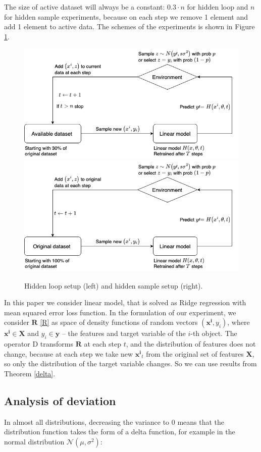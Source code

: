 \documentclass{article}
\begin{document}
        The size of active dataset will always be a constant: $0.3 \cdot n$ for hidden loop and $n$ for hidden sample experiments, because on each step we remove 1 element and add 1 element to active data. The schemes of the experiments is shown in Figure \ref{ex_set}.

        \begin{figure}[h!]
            \centering
            \includegraphics[width=0.49\linewidth]{pictures/Hidden_loop.png}
            \includegraphics[width=0.49\linewidth]{pictures/Hidden_sample.png}
            
            \caption{Hidden loop setup (left) and hidden sample setup (right).}
            \label{ex_set}
        \end{figure}

        In this paper we consider linear model, that is solved as Ridge regression with mean squared error loss function. In the formulation of our experiment, we consider $\mathbf{R}$ \eqref{R} as space of density functions of random vectors $(\mathbf{x^i}, y_i)$, where $\mathbf{x^i} \in \textbf{X}$ and $y_i \in \textbf{y}$ -- the features and target variable of the $i$-th object. The operator $\text{D}$ transforms $\mathbf{R}$ at each step $t$, and the distribution of features does not change, because at each step we take new $\mathbf{x^i}_t$ from the original set of features $\textbf{X}$, so only the distribution of the target variable changes. So we can use results from Theorem \ref{delta}. 

    \subsection{Analysis of deviation} \label{exp_1}

        In almost all distributions, decreasing the variance to 0 means that the distribution function takes the form of a delta function, for example in the normal distribution $\mathcal{N}(\mu, \sigma^2)$:
\end{document}
